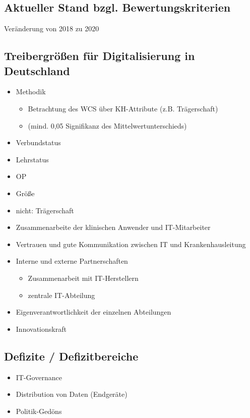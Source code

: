 \subsection{Aktueller Stand bzgl. Bewertungskriterien}
	Veränderung von 2018 zu 2020
\subsection{Treibergrößen für Digitalisierung in Deutschland}
\begin{itemize}
	\item Methodik
	\begin{itemize}
		\item Betrachtung des WCS über KH-Attribute (z.B. Trägerschaft)
		\item (mind. 0,05 Signifikanz des Mittelwertunterschieds)
	\end{itemize}
\end{itemize}
\begin{itemize}
	\item Verbundstatus \parencite{cresswell2013}
	\item Lehrstatus
	\item OP
	\item Größe \parencite{cresswell2013}
	\item nicht: Trägerschaft \parencite{cresswell2013}
\end{itemize}
\begin{itemize}
	\item Zusammenarbeite der klinischen Anwender und IT-Mitarbeiter
	\item Vertrauen und gute Kommunikation zwischen IT und Krankenhausleitung
	\item Interne und externe Partnerschaften
	\begin{itemize}
		\item Zusammenarbeit mit IT-Herstellern
		\item zentrale IT-Abteilung
	\end{itemize}
	\item Eigenverantwortlichkeit der einzelnen Abteilungen
	\item Innovationskraft
\end{itemize}
\subsection{Defizite / Defizitbereiche}
\begin{itemize}
	\item IT-Governance
	\item Distribution von Daten (Endgeräte)
	\item Politik-Gedöns
\end{itemize}
